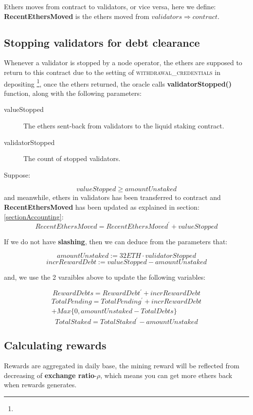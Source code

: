 \documentclass{article}
\begin{document}
Ethers moves from contract to validators, or vice versa, here we define: \textbf{RecentEthersMoved} is the ethers moved from ${validators}\Longrightarrow{contract}$.

\subsection{Stopping validators for debt clearance}
Whenever a validator is stopped by a node operator, the ethers are supposed to return to this contract due to the setting of \textsc{withdrawal\_credentials} in depositing \footnote{}, once the ethers returned, the oracle calls \textbf{validatorStopped()} function, along with the following parameters:
\begin{description}
\item[valueStopped] The ethers sent-back from validators to the liquid staking contract.
\item[validatorStopped] The count of stopped validators.
\end{description}
Suppose:

\[valueStopped \geq amountUnstaked \]
and meanwhile, ethers in validators has been transferred to contract and \textbf{RecentEthersMoved} has been updated as explained in section:\ref{sectionAccounting}:
\[RecentEthersMoved = RecentEthersMoved^{\prime} + valueStopped\]

If we do not have \textbf{slashing}, then we can deduce from the parameters that:
\begin{lemma}
\[amountUnstaked := 32 ETH \cdot validatorStopped\]
\[incrRewardDebt := valueStopped - amountUnstaked\]
\end{lemma}

and, we use the 2 varaibles above to update the following variables:
\begin{theorem}
\label{validatorStopped}
\[RewardDebts = RewardDebt^{\prime} + incrRewardDebt\]
\begin{multline}
TotalPending = TotalPending^{\prime} + incrRewardDebt \\
+ Max\{0, amountUnstaked - TotalDebts\}
\end{multline}
\[TotalStaked = TotalStaked^{\prime} -  amountUnstaked \]
\end{theorem}

\subsection{Calculating rewards}
Rewards are aggregated in daily base, the mining reward will be reflected from decreasing of \textbf{exchange ratio}-$\rho$, which means you can get more ethers back when rewards generates.
\end{document}

